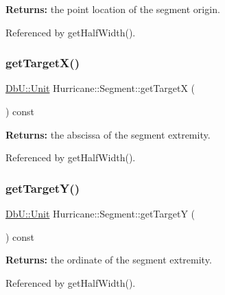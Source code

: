 {\bfseries Returns\+:} the point location of the segment origin. 

Referenced by get\+Half\+Width().

\mbox{\label{classHurricane_1_1Segment_abba6713e109a0925c078a9785274f389}} 
\subsubsection{\texorpdfstring{get\+Target\+X()}{getTargetX()}}
{\footnotesize\ttfamily \hyperlink{group__DbUGroup_ga4fbfa3e8c89347af76c9628ea06c4146}{Db\+U\+::\+Unit} Hurricane\+::\+Segment\+::get\+TargetX (\begin{DoxyParamCaption}{ }\end{DoxyParamCaption}) const\hspace{0.3cm}{\ttfamily [pure virtual]}}

{\bfseries Returns\+:} the abscissa of the segment extremity. 

Referenced by get\+Half\+Width().

\mbox{\label{classHurricane_1_1Segment_a27d530abcff9742b81c4b549db161b90}} 
\subsubsection{\texorpdfstring{get\+Target\+Y()}{getTargetY()}}
{\footnotesize\ttfamily \hyperlink{group__DbUGroup_ga4fbfa3e8c89347af76c9628ea06c4146}{Db\+U\+::\+Unit} Hurricane\+::\+Segment\+::get\+TargetY (\begin{DoxyParamCaption}{ }\end{DoxyParamCaption}) const\hspace{0.3cm}{\ttfamily [pure virtual]}}

{\bfseries Returns\+:} the ordinate of the segment extremity. 

Referenced by get\+Half\+Width().

\mbox{\label{classHurricane_1_1Segment_af24bee306be3461bb5dd1ba680f2a2df}} 
